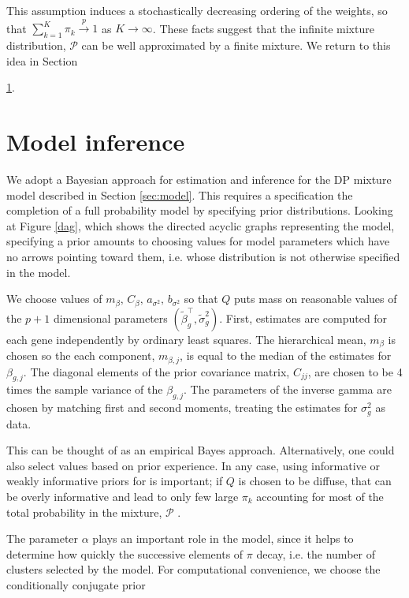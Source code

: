 This assumption induces a stochastically decreasing ordering of the weights, so that $\sum_{k=1}^K \pi_k \stackrel{p}{\rightarrow} 1$ as $K\rightarrow \infty$. These facts suggest that the infinite mixture distribution, $\mathcal{P}$ can be well approximated by a finite mixture. We return to this idea in Section {\ref{sec:inference}. 



\section{Model inference}
\label{sec:inference}
We adopt a Bayesian approach for estimation and inference for the DP mixture model described in Section \ref{sec:model}. This requires a specification the completion of a full probability model by specifying prior distributions. Looking at Figure \ref{dag}, which shows the directed acyclic graphs representing the model, specifying a prior amounts to choosing values for model parameters which have no arrows pointing toward them, i.e. whose distribution is not otherwise specified in the model.

We choose values of $m_\beta,\,C_\beta,\,a_{\sigma^2},\,b_{\sigma^2}$ so that $Q$ puts mass on reasonable values of the $p+1$ dimensional parameters $\left(\tilde{\beta}_g^\top,\tilde{\sigma}^2_g\right)$. First, estimates are computed for each gene independently by ordinary least squares. The hierarchical mean, $m_\beta$ is chosen so the each component, $m_{\beta,j}$, is equal to the median of the estimates for $\beta_{g,j}$. The diagonal elements of the prior covariance matrix, $C_{jj}$, are chosen to be 4 times the sample variance of the $\beta_{g,j}$. The parameters of the inverse gamma are chosen by matching first and second moments, treating the estimates for $\sigma^2_g$ as data.

This can be thought of as an empirical Bayes approach. Alternatively, one could also select values based on prior experience. In any case, using informative or weakly informative priors for is important; if $Q$ is chosen to be diffuse, that can be overly informative and lead to only few large $\pi_k$ accounting for most of the total probability in the mixture, $\mathcal{P}$ \citep{gelman-book}.

The parameter $\alpha$ plays an important role in the model, since it helps to determine how quickly the successive elements of $\pi$ decay, i.e. the number of clusters selected by the model. For computational convenience, we choose the conditionally conjugate prior

}
